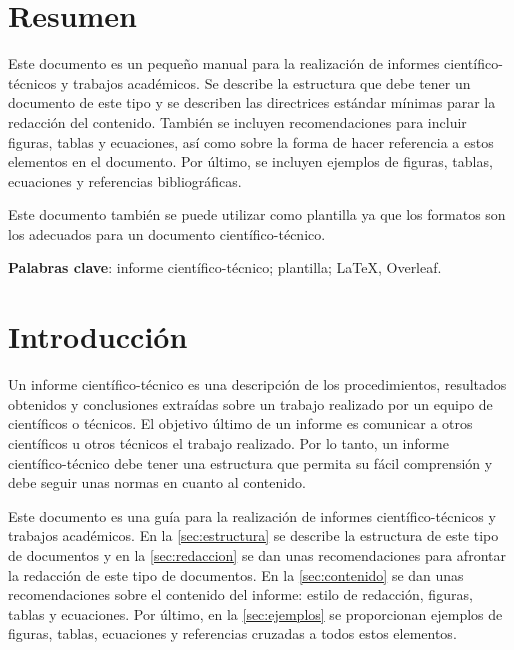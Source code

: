 \documentclass[11pt]{article}
\begin{document}





{}
\section*{Resumen}

Este documento es un pequeño manual para la realización de informes científico-técnicos y trabajos académicos. Se describe la estructura que debe tener un documento de este tipo y se describen las directrices estándar mínimas parar la redacción del contenido. También se incluyen recomendaciones para incluir figuras, tablas y ecuaciones, así como sobre la forma de hacer referencia a estos elementos en el documento. Por último, se incluyen ejemplos de figuras, tablas, ecuaciones y referencias bibliográficas.

Este documento también se puede utilizar como plantilla ya que los formatos son los adecuados para un documento científico-técnico.

\textbf{Palabras clave}: informe científico-técnico; plantilla; \LaTeX, Overleaf.


\section{Introducción}
\label{sec:introduccion}

Un informe científico-técnico es una descripción de los procedimientos, resultados obtenidos y conclusiones extraídas sobre un trabajo realizado por un equipo de científicos o técnicos. El objetivo último de un informe es comunicar a otros científicos u otros técnicos el trabajo realizado. Por lo tanto, un informe científico-técnico debe tener una estructura que permita su fácil comprensión y debe seguir unas normas en cuanto al contenido.

Este documento es una guía para la realización de informes científico-técnicos y trabajos académicos. En la \autoref{sec:estructura} se describe la estructura de este tipo de documentos y en la \autoref{sec:redaccion} se dan unas recomendaciones para afrontar la redacción de este tipo de documentos. En la \autoref{sec:contenido} se dan unas recomendaciones sobre el contenido del informe: estilo de redacción, figuras, tablas y ecuaciones. Por último, en la \autoref{sec:ejemplos} se proporcionan ejemplos de figuras, tablas, ecuaciones y referencias cruzadas a todos estos elementos.
\end{document}
